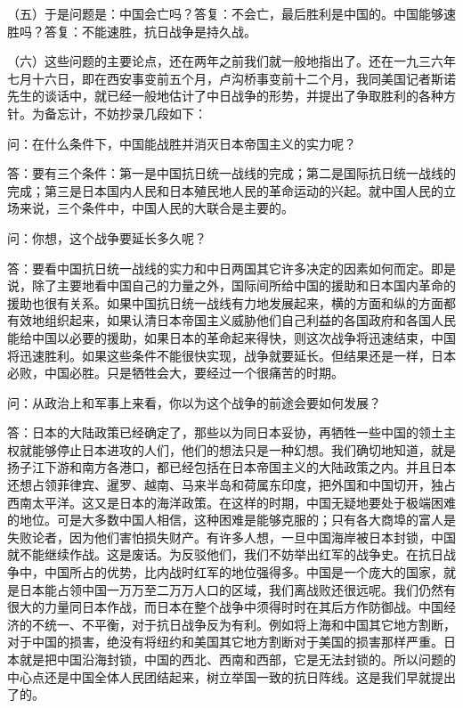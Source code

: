 \documentclass[UTF8, 12pt, a4paper]{ctexrep}
\begin{document}
（五）于是问题是：中国会亡吗？答复：不会亡，最后胜利是中国的。中国能够速胜吗？答复：不能速胜，抗日战争是持久战。

（六）这些问题的主要论点，还在两年之前我们就一般地指出了。还在一九三六年七月十六日，即在西安事变前五个月，卢沟桥事变前十二个月，我同美国记者斯诺先生的谈话中，就已经一般地估计了中日战争的形势，并提出了争取胜利的各种方针。为备忘计，不妨抄录几段如下：

问：在什么条件下，中国能战胜并消灭日本帝国主义的实力呢？

答：要有三个条件：第一是中国抗日统一战线的完成；第二是国际抗日统一战线的完成；第三是日本国内人民和日本殖民地人民的革命运动的兴起。就中国人民的立场来说，三个条件中，中国人民的大联合是主要的。

问：你想，这个战争要延长多久呢？

答：要看中国抗日统一战线的实力和中日两国其它许多决定的因素如何而定。即是说，除了主要地看中国自己的力量之外，国际间所给中国的援助和日本国内革命的援助也很有关系。如果中国抗日统一战线有力地发展起来，横的方面和纵的方面都有效地组织起来，如果认清日本帝国主义威胁他们自己利益的各国政府和各国人民能给中国以必要的援助，如果日本的革命起来得快，则这次战争将迅速结束，中国将迅速胜利。如果这些条件不能很快实现，战争就要延长。但结果还是一样，日本必败，中国必胜。只是牺牲会大，要经过一个很痛苦的时期。

问：从政治上和军事上来看，你以为这个战争的前途会要如何发展？

答：日本的大陆政策已经确定了，那些以为同日本妥协，再牺牲一些中国的领土主权就能够停止日本进攻的人们，他们的想法只是一种幻想。我们确切地知道，就是扬子江下游和南方各港口，都已经包括在日本帝国主义的大陆政策之内。并且日本还想占领菲律宾、暹罗、越南、马来半岛和荷属东印度，把外国和中国切开，独占西南太平洋。这又是日本的海洋政策。在这样的时期，中国无疑地要处于极端困难的地位。可是大多数中国人相信，这种困难是能够克服的；只有各大商埠的富人是失败论者，因为他们害怕损失财产。有许多人想，一旦中国海岸被日本封锁，中国就不能继续作战。这是废话。为反驳他们，我们不妨举出红军的战争史。在抗日战争中，中国所占的优势，比内战时红军的地位强得多。中国是一个庞大的国家，就是日本能占领中国一万万至二万万人口的区域，我们离战败还很远呢。我们仍然有很大的力量同日本作战，而日本在整个战争中须得时时在其后方作防御战。中国经济的不统一、不平衡，对于抗日战争反为有利。例如将上海和中国其它地方割断，对于中国的损害，绝没有将纽约和美国其它地方割断对于美国的损害那样严重。日本就是把中国沿海封锁，中国的西北、西南和西部，它是无法封锁的。所以问题的中心点还是中国全体人民团结起来，树立举国一致的抗日阵线。这是我们早就提出了的。
\end{document}
